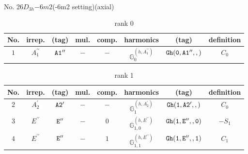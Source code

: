 \documentclass[fleqn,8pt]{jsarticle}
\begin{document}
\setcounter{MaxMatrixCols}{16}

\begin{center}
\LARGE
No. 26\quad$D_{3h}$\quad$-6m2$\quad(-6m2 setting)\quad[ hexagonal ] (axial)
\end{center}
\begin{table}[ht!]
\begin{center}
\caption{rank 0}
\renewcommand{\arraystretch}{1.3}
\begin{tabular}{cccccccc} \hline \hline
No. & irrep. & (tag) & mul. & comp. & harmonics & (tag) & definition \\ \hline
$ 1 $ & $ A_{1}^{\prime\prime} $ & $ {\tt A1''} $ & $ - $ & $ - $ & $ \mathbb{G}_{0}^{(h,A_{1}^{\prime\prime})} $ & $ {\tt Gh(0,A1'',,)} $ & $ C_{0} $ \\
 \hline \hline
\end{tabular}
\end{center}
\end{table}
\begin{table}[ht!]
\begin{center}
\caption{rank 1}
\renewcommand{\arraystretch}{1.3}
\begin{tabular}{cccccccc} \hline \hline
No. & irrep. & (tag) & mul. & comp. & harmonics & (tag) & definition \\ \hline
$ 2 $ & $ A_{2}^{\prime} $ & $ {\tt A2'} $ & $ - $ & $ - $ & $ \mathbb{G}_{1}^{(h,A_{2}^{\prime})} $ & $ {\tt Gh(1,A2',,)} $ & $ C_{0} $ \\
$ 3 $ & $ E^{\prime\prime} $ & $ {\tt E''} $ & $ - $ & $ 0 $ & $ \mathbb{G}_{1,0}^{(h,E^{\prime\prime})} $ & $ {\tt Gh(1,E'',,0)} $ & $ - S_{1} $ \\
$ 4 $ & $ E^{\prime\prime} $ & $ {\tt E''} $ & $ - $ & $ 1 $ & $ \mathbb{G}_{1,1}^{(h,E^{\prime\prime})} $ & $ {\tt Gh(1,E'',,1)} $ & $ C_{1} $ \\
 \hline \hline
\end{tabular}
\end{center}
\end{table}
\end{document}
